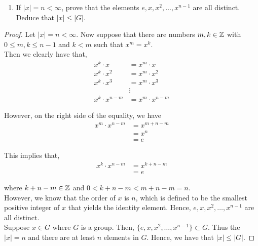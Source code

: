 \documentclass[11pt, reqno]{amsart}
\theoremstyle{plain}
\theoremstyle{definition}
\theoremstyle{example}
\begin{document}
\begin{enumerate}[1.]
\begin{enumerate}
\begin{proof}
Since $x^2 = xx = e$ and $y^2 = yy = e$, we have that $x = x^{-1}$ and $y = y^{-1}$. If $|xy| = 1$ or $|xy| = 2$, then $xy = (xy)^{-1}$ and
\begin{align*}
xy = (xy)^{-1} = y^{-1}x^{-1} = yx
\end{align*}

as required

\end{proof}

\item If $|x| = n < \infty$, prove that the elements $e, x, x^2, \dots, x^{n-1}$ are all distinct. Deduce that $|x| \leq |G|$. 
\end{enumerate}

\begin{proof}
Let $|x| = n < \infty$. Now suppose that there are numbers $m, k \in \mathbb{Z}$ with $0 \leq m, k \leq n-1$ and $k < m$ such that $x^m = x^k$.\\

Then we clearly have that,
\begin{align*}
x^k \cdot x &= x^m \cdot x\\
x^k \cdot x^2 &= x^m \cdot x^2\\
x^k \cdot x^3 &= x^m \cdot x^3\\
&\vdots\\
x^k \cdot x^{n-m} &= x^m \cdot x^{n-m}
\end{align*}

However, on the right side of the equality, we have
\begin{align*}
x^m \cdot x^{n-m} &= x^{m+n-m}\\
&= x^n\\
&= e
\end{align*}

This implies that,
\begin{align*}
x^k \cdot x^{n-m} &= x^{k+n-m}\\
&= e
\end{align*}

where $k+n-m \in \mathbb{Z}$ and $0 < k+n-m < m+n-m = n$.\\

However, we know that the order of $x$ is $n$, which is defined to be the smallest positive integer of $x$ that yields the identity element. Hence, $e, x, x^2, \dots, x^{n-1}$ are all distinct.\\

Suppose $x \in G$ where $G$ is a group. Then, $\{e, x, x^2, \dots, x^{n-1}\} \subset G$. Thus the $|x| = n$ and there are at least $n$ elements in $G$. Hence, we have that $|x| \leq |G|$.
\end{proof}




\end{enumerate}
\end{document}
